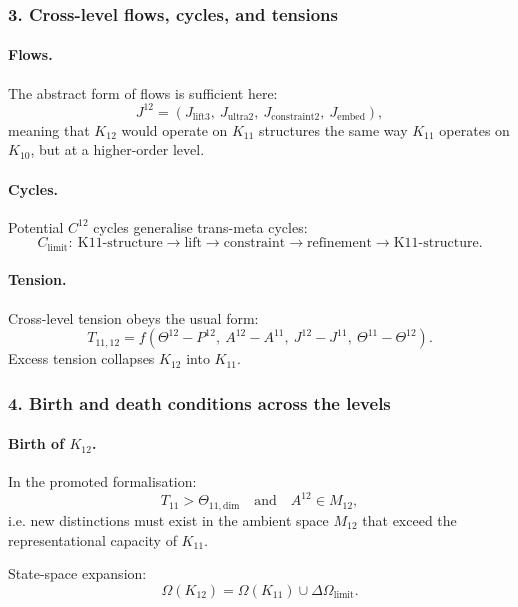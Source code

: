 \subsubsection{3. Cross-level flows, cycles, and tensions}

\paragraph{Flows.}
The abstract form of flows is sufficient here:
\[
J^{12} = (J_{\mathrm{lift3}},\ J_{\mathrm{ultra2}},\
          J_{\mathrm{constraint2}},\ J_{\mathrm{embed}}),
\]
meaning that $K_{12}$ would operate on $K_{11}$ structures the same way
$K_{11}$ operates on $K_{10}$, but at a higher-order level.

\paragraph{Cycles.}
Potential $C^{12}$ cycles generalise trans-meta cycles:
\[
C_{\mathrm{limit}}:\ 
\text{K11-structure} \rightarrow \text{lift} \rightarrow
\text{constraint} \rightarrow \text{refinement} \rightarrow \text{K11-structure}.
\]

\paragraph{Tension.}
Cross-level tension obeys the usual form:
\[
T_{11,12} =
f(\Theta^{12} - P^{12},\ A^{12} - A^{11},\
  J^{12} - J^{11},\ \Theta^{11} - \Theta^{12}).
\]
Excess tension collapses $K_{12}$ into $K_{11}$.

\subsubsection{4. Birth and death conditions across the levels}

\paragraph{Birth of $K_{12}$.}
In the promoted formalisation:
\[
T_{11} > \Theta_{11,\mathrm{dim}}
\quad\text{and}\quad
A^{12} \in M_{12},
\]
i.e. new distinctions must exist in the ambient space $M_{12}$ that exceed
the representational capacity of $K_{11}$.

State-space expansion:
\[
\Omega(K_{12}) = \Omega(K_{11}) \cup \Delta\Omega_{\mathrm{limit}}.
\]

